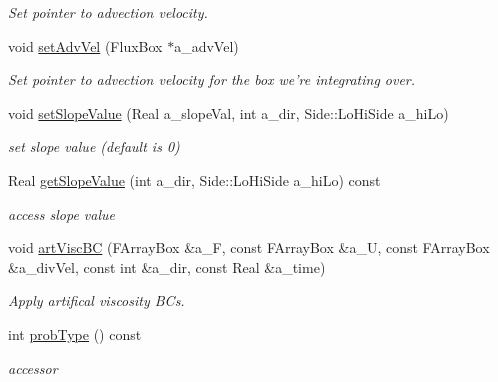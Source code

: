\begin{DoxyCompactItemize}
\begin{DoxyCompactList}\small\item\em Set pointer to advection velocity. \end{DoxyCompactList}\item 
\hypertarget{class_advect_i_b_c_aae3c93645117a85f8ed4efbc758d9cc6}{void \hyperlink{class_advect_i_b_c_aae3c93645117a85f8ed4efbc758d9cc6}{set\-Adv\-Vel} (Flux\-Box $\ast$a\-\_\-adv\-Vel)}\label{class_advect_i_b_c_aae3c93645117a85f8ed4efbc758d9cc6}

\begin{DoxyCompactList}\small\item\em Set pointer to advection velocity for the box we're integrating over. \end{DoxyCompactList}\item 
\hypertarget{class_advect_i_b_c_a142042663359db469a777366ca287855}{void \hyperlink{class_advect_i_b_c_a142042663359db469a777366ca287855}{set\-Slope\-Value} (Real a\-\_\-slope\-Val, int a\-\_\-dir, Side\-::\-Lo\-Hi\-Side a\-\_\-hi\-Lo)}\label{class_advect_i_b_c_a142042663359db469a777366ca287855}

\begin{DoxyCompactList}\small\item\em set slope value (default is 0) \end{DoxyCompactList}\item 
\hypertarget{class_advect_i_b_c_a8feb7b809940db26555a59073cdb9de7}{Real \hyperlink{class_advect_i_b_c_a8feb7b809940db26555a59073cdb9de7}{get\-Slope\-Value} (int a\-\_\-dir, Side\-::\-Lo\-Hi\-Side a\-\_\-hi\-Lo) const }\label{class_advect_i_b_c_a8feb7b809940db26555a59073cdb9de7}

\begin{DoxyCompactList}\small\item\em access slope value \end{DoxyCompactList}\item 
\hypertarget{class_advect_i_b_c_a8109239cfc7cc3637da64045e4df1f30}{void \hyperlink{class_advect_i_b_c_a8109239cfc7cc3637da64045e4df1f30}{art\-Visc\-B\-C} (F\-Array\-Box \&a\-\_\-\-F, const F\-Array\-Box \&a\-\_\-\-U, const F\-Array\-Box \&a\-\_\-div\-Vel, const int \&a\-\_\-dir, const Real \&a\-\_\-time)}\label{class_advect_i_b_c_a8109239cfc7cc3637da64045e4df1f30}

\begin{DoxyCompactList}\small\item\em Apply artifical viscosity B\-Cs. \end{DoxyCompactList}\item 
\hypertarget{class_advect_i_b_c_ae61302d20370083b3d249c994aa368da}{int \hyperlink{class_advect_i_b_c_ae61302d20370083b3d249c994aa368da}{prob\-Type} () const }\label{class_advect_i_b_c_ae61302d20370083b3d249c994aa368da}

\begin{DoxyCompactList}\small\item\em accessor \end{DoxyCompactList}\end{DoxyCompactItemize}
